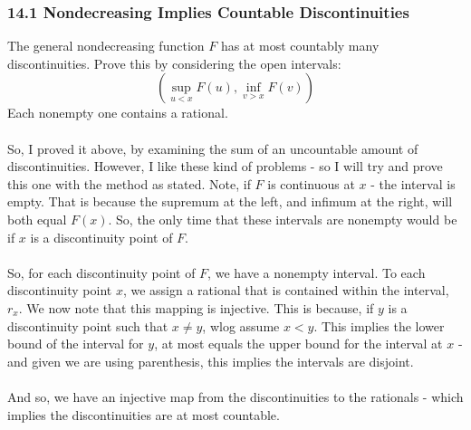 \documentclass[12pt,a4paper]{article}
\newcommand{\1}[1]{\mathbbm{1}\left\{ #1 \right\}}
\begin{document}
\subsubsection{14.1 Nondecreasing Implies Countable Discontinuities} The general nondecreasing function $F$ has at most countably many discontinuities. Prove this by considering the open intervals:
$$
	\left(\sup_{u < x} F(u), \inf_{v > x} F(v)\right)
$$
Each nonempty one contains a rational.
\\\\
So, I proved it above, by examining the sum of an uncountable amount of discontinuities. However, I like these kind of problems - so I will try and prove this one with the method as stated. Note, if $F$ is continuous at $x$ - the interval is empty. That is because the supremum at the left, and infimum at the right, will both equal $F(x)$. So, the only time that these intervals are nonempty would be if $x$ is a discontinuity point of $F$.
\\\\
So, for each discontinuity point of $F$, we have a nonempty interval. To each discontinuity point $x$, we assign a rational that is contained within the interval, $r_x$. We now note that this mapping is injective. This is because, if $y$ is a discontinuity point such that $x \neq y$, wlog assume $x < y$. This implies the lower bound of the interval for $y$, at most equals the upper bound for the interval at $x$ - and given we are using parenthesis, this implies the intervals are disjoint.
\\\\
And so, we have an injective map from the discontinuities to the rationals - which implies the discontinuities are at most countable.
\end{document}
